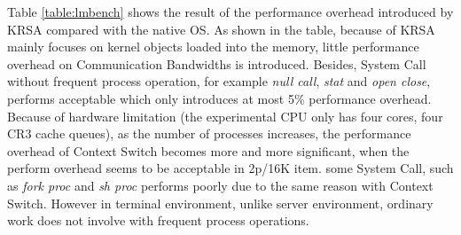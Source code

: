 \documentclass[conference]{IEEEtran}
\begin{document}
Table \ref{table:lmbench} shows the result of the performance overhead introduced by KRSA compared with the native OS. As shown in the table, because of KRSA mainly focuses on kernel objects loaded into the memory, little performance overhead on Communication Bandwidths is introduced. Besides, System Call without frequent process operation, for example \textit{null call}, \textit{stat} and \textit{open close}, performs acceptable which only introduces at most 5\% performance overhead. 
Because of hardware limitation (the experimental CPU only has four cores, four CR3 cache queues), as the number of processes increases, the performance overhead of Context Switch becomes more and more significant, when the perform overhead seems to be acceptable in 2p/16K item. some System Call, such as \textit{fork proc} and \textit{sh proc} performs poorly due to the same reason with Context Switch. However in terminal environment, unlike server environment, ordinary work does not involve with frequent process operations. 
\end{document}
